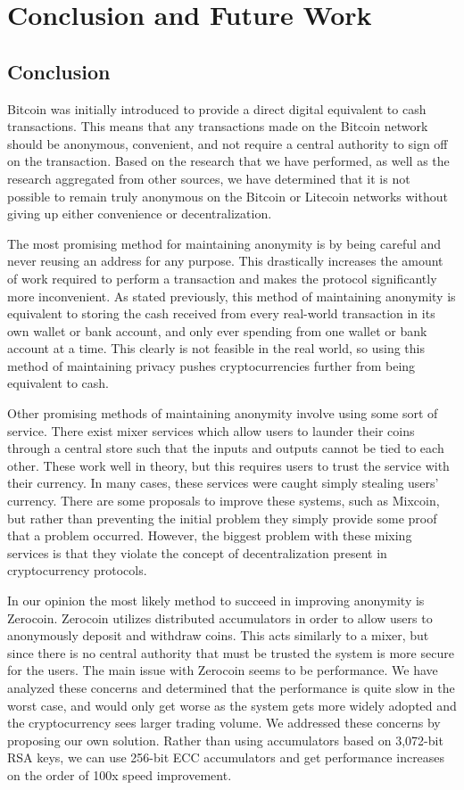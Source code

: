 \documentclass[11pt]{article}
\begin{document}
\section{Conclusion and Future Work}
\subsection{Conclusion}
Bitcoin was initially introduced to provide a direct digital equivalent to cash transactions. This means that any
transactions made on the Bitcoin network should be anonymous, convenient, and not require a central authority to sign
off on the transaction. Based on the research that we have performed, as well as the research aggregated from other
sources, we have determined that it is not possible to remain truly anonymous on the Bitcoin or Litecoin networks
without giving up either convenience or decentralization. 

The most promising method for maintaining anonymity is by being careful and never reusing an address for any purpose.
This drastically increases the amount of work required to perform a transaction and makes the protocol significantly
more inconvenient. As stated previously, this method of maintaining anonymity is equivalent to storing the cash received
from every real-world transaction in its own wallet or bank account, and only ever spending from one wallet or bank
account at a time. This clearly is not feasible in the real world, so using this method of maintaining privacy pushes
cryptocurrencies further from being equivalent to cash.

Other promising methods of maintaining anonymity involve using some sort of service. There exist mixer services which
allow users to launder their coins through a central store such that the inputs and outputs cannot be tied to each
other. These work well in theory, but this requires users to trust the service with their currency. In many cases, these
services were caught simply stealing users' currency. There are some proposals to improve these systems, such as
Mixcoin, but rather than preventing the initial problem they simply provide some proof that a problem occurred. However,
the biggest problem with these mixing services is that they violate the concept of decentralization present in
cryptocurrency protocols.

In our opinion the most likely method to succeed in improving anonymity is Zerocoin. Zerocoin utilizes distributed
accumulators in order to allow users to anonymously deposit and withdraw coins. This acts similarly to a mixer, but
since there is no central authority that must be trusted the system is more secure for the users. The main issue with
Zerocoin seems to be performance. We have analyzed these concerns and determined that the performance is quite slow in
the worst case, and would only get worse as the system gets more widely adopted and the cryptocurrency sees larger
trading volume. We addressed these concerns by proposing our own solution. Rather than using accumulators based on
3,072-bit RSA keys, we can use 256-bit ECC accumulators and get performance increases on the order of 100x speed
improvement.
\end{document}
